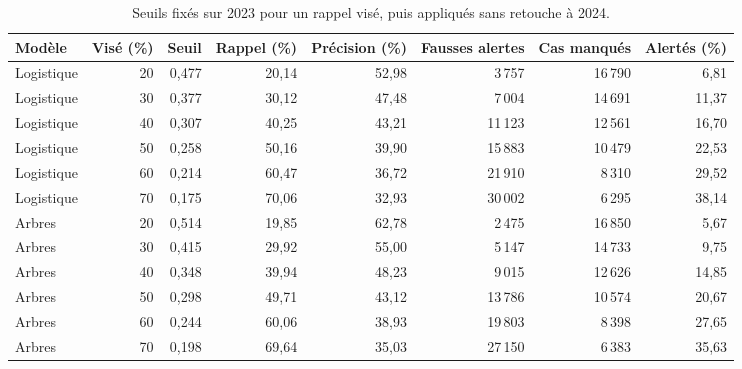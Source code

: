 \begin{table}[htbp]
\centering\small
\renewcommand{\arraystretch}{1.18}
\caption{Seuils fixés sur 2023 pour un rappel visé, puis appliqués sans retouche à 2024.}\label{tab:ml-seuils}
\begin{tabularx}{\textwidth}{@{}Lrrrrrrr@{}}
\toprule
Modèle & Visé (\%) & Seuil & Rappel (\%) & Précision (\%) & Fausses alertes & Cas manqués & Alertés (\%) \\
\midrule
Logistique & 20 & 0,477 & 20,14 & 52,98 & 3\,757 & 16\,790 & 6,81 \\
Logistique & 30 & 0,377 & 30,12 & 47,48 & 7\,004 & 14\,691 & 11,37 \\
Logistique & 40 & 0,307 & 40,25 & 43,21 & 11\,123 & 12\,561 & 16,70 \\
Logistique & 50 & 0,258 & 50,16 & 39,90 & 15\,883 & 10\,479 & 22,53 \\
Logistique & 60 & 0,214 & 60,47 & 36,72 & 21\,910 & 8\,310 & 29,52 \\
Logistique & 70 & 0,175 & 70,06 & 32,93 & 30\,002 & 6\,295 & 38,14 \\
Arbres & 20 & 0,514 & 19,85 & 62,78 & 2\,475 & 16\,850 & 5,67 \\
Arbres & 30 & 0,415 & 29,92 & 55,00 & 5\,147 & 14\,733 & 9,75 \\
Arbres & 40 & 0,348 & 39,94 & 48,23 & 9\,015 & 12\,626 & 14,85 \\
Arbres & 50 & 0,298 & 49,71 & 43,12 & 13\,786 & 10\,574 & 20,67 \\
Arbres & 60 & 0,244 & 60,06 & 38,93 & 19\,803 & 8\,398 & 27,65 \\
Arbres & 70 & 0,198 & 69,64 & 35,03 & 27\,150 & 6\,383 & 35,63 \\
\bottomrule
\end{tabularx}
\end{table}
